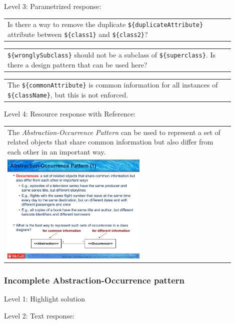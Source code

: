 \noindent Level 3: Parametrized response: \medskip

\begin{tabular}{|p{0.9\linewidth}}
Is there a way to remove the duplicate \verb|${duplicateAttribute}| attribute between \verb|${class1}| and \verb|${class2}|?
\end{tabular} \medskip

\begin{tabular}{|p{0.9\linewidth}}
\verb|${wronglySubclass}| should not be a subclass of \verb|${superclass}|. Is there a design pattern that can be used here?
\end{tabular} \medskip

\begin{tabular}{|p{0.9\linewidth}}
The \verb|${commonAttribute}| is common information for all instances of \verb|${className}|, but this is not enforced.
\end{tabular} \medskip

\noindent Level 4: Resource response with Reference: \medskip

\begin{tabular}{|p{0.9\linewidth}}
The \textit{Abstraction-Occurrence Pattern} can be used to 
represent a set of related objects that share common information but also differ
from each other in an important way.

\\
\includegraphics[width=0.6\textwidth]{images/abstraction_occurrence.png}
\end{tabular} \medskip


\subsubsection{Incomplete Abstraction-Occurrence pattern}

\noindent Level 1: Highlight solution \medskip

\noindent Level 2: Text response: \medskip

